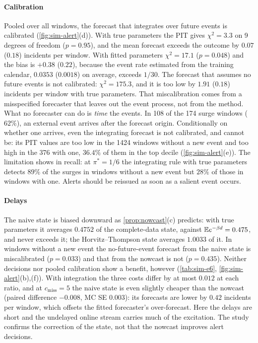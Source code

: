 \paragraph{Calibration} Pooled over all windows, the forecast that integrates over future
events is calibrated (\cref{fig:sim-alert}(d)). With true parameters the PIT gives
$\chi^2=3.3$ on 9 degrees of freedom ($p=0.95$), and the mean forecast exceeds the outcome
by $0.07$ ($0.18$) incidents per window. With fitted parameters $\chi^2=17.1$ ($p=0.048$)
and the bias is $+0.38$ ($0.22$), because the event rate estimated from the training
calendar, $0.0353$ ($0.0018$) on average, exceeds $1/30$. The forecast that assumes no
future events is not calibrated: $\chi^2=175.3$, and it is too low by $1.91$ ($0.18$)
incidents per window with true parameters. That miscalibration comes from a misspecified
forecaster that leaves out the event process, not from the method. What no forecaster can
do is \emph{time} the events. In 108 of the 174 surge windows ($62\%$), an external event
arrives after the forecast origin. Conditionally on whether one arrives, even the
integrating forecast is not calibrated, and cannot be: its PIT values are too low in the
1424 windows without a new event and too high in the 376 with one, $36.4\%$ of them in the
top decile (\cref{fig:sim-alert}(e)). The limitation shows in recall: at $\pi^*=1/6$ the
integrating rule with true parameters detects $89\%$ of the surges in windows without a new
event but $28\%$ of those in windows with one. Alerts should be reissued as soon as a
salient event occurs.

\paragraph{Delays} The naive state is biased downward as \cref{prop:nowcast}(c) predicts:
with true parameters it averages $0.4752$ of the complete-data state, against
$\mathbb{E} e^{-\beta d}=0.475$, and never exceeds it; the Horvitz--Thompson state averages
$1.0033$ of it. In windows without a new event the no-future-event forecast from the naive
state is miscalibrated ($p=0.033$) and that from the nowcast is not ($p=0.435$). Neither
decisions nor pooled calibration show a benefit, however (\cref{tab:sim-e6},
\cref{fig:sim-alert}(b),(f)). With integration the three costs differ by at most $0.012$ at
each ratio, and at $c_{\mathrm{miss}}=5$ the naive state is even slightly cheaper than the
nowcast (paired difference $-0.008$, MC SE $0.003$): its forecasts are lower by $0.42$
incidents per window, which offsets the fitted forecaster's over-forecast. Here the delays
are short and the undelayed online stream carries much of the excitation. The study
confirms the correction of the state, not that the nowcast improves alert decisions.

